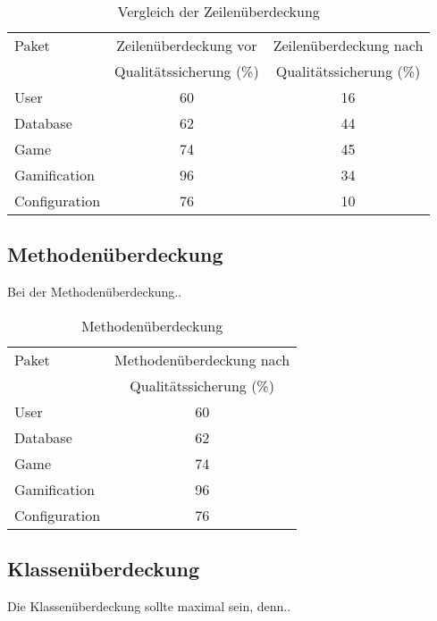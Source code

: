 \documentclass[a4paper]{scrreprt}
\begin{document}
    \vspace{20pt}
    \begin{table}[h]
        \begin{center}
        \begin{tabular}{ | l | c | c | }
            \hline
            Paket & Zeilenüberdeckung vor  & Zeilenüberdeckung nach \\
            & Qualitätssicherung (\%)  & Qualitätssicherung (\%) \\ \hline
            User & 60 & 16 \\
            Database & 62 & 44 \\
            Game & 74 & 45 \\
            Gamification & 96 & 34 \\
            Configuration & 76 & 10 \\
            \hline
        \end{tabular}
        \end{center}
        \caption{Vergleich der Zeilenüberdeckung}
    \end{table}%

    \newpage

    \subsection{Methodenüberdeckung}
    Bei der Methodenüberdeckung..

    \vspace{20pt}
    \begin{table}[h]
        \begin{center}
        \begin{tabular}{ | l | c | }
            \hline
            Paket & Methodenüberdeckung nach \\
            & Qualitätssicherung (\%) \\ \hline
            User & 60 \\
            Database & 62 \\
            Game & 74 \\
            Gamification & 96 \\
            Configuration & 76  \\
            \hline
        \end{tabular}
        \end{center}
        \caption{Methodenüberdeckung}
    \end{table}%

    \subsection{Klassenüberdeckung}
    Die Klassenüberdeckung sollte maximal sein, denn..
\end{document}
